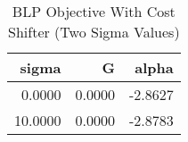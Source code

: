 \begin{table}[htbp]
    \centering
    \caption{BLP Objective With Cost Shifter (Two Sigma Values)}
    \label{tab:q5_blp_costshifter_G}
\begin{tabular}{rrr}
\toprule
sigma & G & alpha \\
\midrule
\midrule
0.0000 & 0.0000 & -2.8627 \\
10.0000 & 0.0000 & -2.8783 \\
\bottomrule
\bottomrule
\end{tabular}

\end{table}
